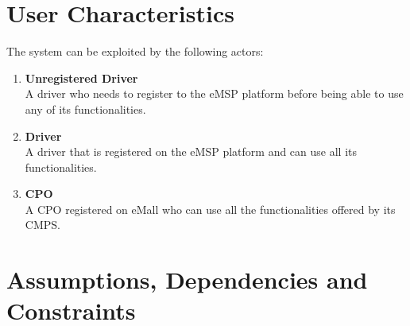 \section{User Characteristics} %
The system can be exploited by the following actors:
\label{sec:userCharacteristics}
\begin{enumerate}
\item \textbf{Unregistered Driver}\\
A driver who needs to register to the eMSP platform before being able to use any of its functionalities.
\item \textbf{Driver}\\
A driver that is registered on the eMSP platform and can use all its functionalities.
\item \textbf{CPO}\\
A CPO registered on eMall who can use all the functionalities offered by its CMPS.
\end{enumerate}

\newpage
\section{Assumptions, Dependencies and Constraints}
\label{sec:assumptionsDependenciesConstraints}

